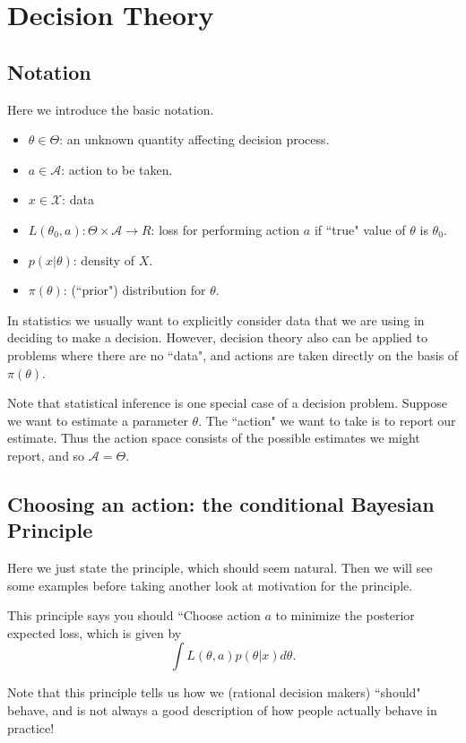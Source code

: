 \documentclass[12pt]{article}
\def\A{\mathcal A}
\def\X{\mathcal X}
\begin{document}
\normalsize

\section{Decision Theory}

\subsection{Notation}

Here we introduce the basic notation.
\begin{itemize}
\item $\theta \in \Theta$: an unknown quantity affecting decision process.
\item $a \in \A$: action to be taken.
\item $x \in \X$: data
\item $L(\theta_0, a): \Theta \times \A \rightarrow R$: loss for performing action $a$ if ``true" value of $\theta$ is $\theta_0$. 
\item $p(x | \theta)$: density of $X$.
\item $\pi(\theta)$: (``prior") distribution for $\theta$.
\end{itemize}

In statistics we usually want to explicitly consider 
data that we are using in deciding
to make a decision. However, decision theory also can be
applied to problems where there are no ``data", and actions are taken directly
on the basis of $\pi(\theta)$.

Note that statistical inference is one special case of
a decision problem. Suppose we want to estimate a parameter $\theta$.
The ``action" we want to take is to report our estimate. 
Thus the action space consists of the possible estimates we might report,
and so $\A=\Theta$.

\subsection{Choosing an action: the conditional Bayesian Principle}

Here we just state the principle, which should seem natural.
Then we will see some examples before taking another look
at motivation for the principle.

This principle says you should ``Choose action $a$ to minimize the posterior expected loss, which is given by
$$\int L(\theta, a) p(\theta | x) d\theta.$$

Note that this principle tells us how we (rational decision makers)
``should" behave, and is
not always a good description of how people actually behave
in practice!
\end{document}
